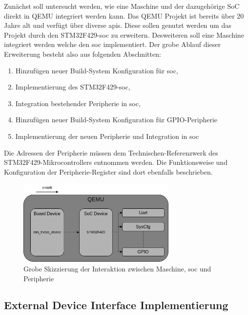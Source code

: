 Zunächst soll untersucht werden, wie eine Maschine und der dazugehörige SoC
direkt in QEMU integriert werden kann.
Das QEMU Projekt ist bereits über 20 Jahre alt und verfügt über diverse
\acp{api}.
Diese sollen genutzt werden um das Projekt durch den STM32F429-\ac{soc} zu
erweitern.
Desweiteren soll eine Maschine integriert werden welche den \ac{soc}
implementiert.
Der grobe Ablauf dieser Erweiterung besteht also aus folgenden Abschnitten:
\begin{enumerate}
    \item Hinzufügen neuer Build-System Konfiguration für \ac{soc},
    \item Implementierung des STM32F429-\ac{soc},
    \item Integration bestehender Peripherie in \ac{soc},
    \item Hinzufügen neuer Build-System Konfiguration für GPIO-Peripherie
    \item Implementierung der neuen Peripherie und Integration in \ac{soc}
\end{enumerate}
Die Adressen der Peripherie müssen dem Technischen-Referenzwerk des
STM32F429-Mikrocontrollers entnommen werden.
Die Funktionsweise und Konfiguration der Peripherie-Register sind dort
ebenfalls beschrieben.
\begin{figure}[!htb]
    \centering
    \includegraphics[width=0.7\textwidth]{anlagen/bilder/Qemu_Device}
    \caption{Grobe Skizzierung der Interaktion zwischen Maschine, \ac{soc} und Peripherie}
    \label{fig:QemuDeviceErweiterung}
\end{figure}


\subsection{External Device Interface Implementierung}

